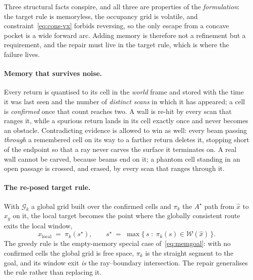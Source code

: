 \documentclass[11pt,a4paper]{article}
\newcommand{\astar}{$A^\star$}
\begin{document}
Three structural facts conspire, and all three are properties of the \emph{formulation}: the target rule is
memoryless, the occupancy grid is volatile, and constraint~\eqref{eq:cons-vx} forbids reversing, so the only
escape from a concave pocket is a wide forward arc. Adding memory is therefore not a refinement but a
requirement, and the repair must live in the target rule, which is where the failure lives.

\paragraph{Memory that survives noise.} Every return is quantised to its cell in the \emph{world} frame and
stored with the time it was last seen and the number of \emph{distinct scans} in which it has appeared; a
cell is \emph{confirmed} once that count reaches two. A wall is re-hit by every scan that ranges it, while a
spurious return lands in its cell exactly once and never becomes an obstacle. Contradicting evidence is
allowed to win as well: every beam passing \emph{through} a remembered cell on its way to a farther return
deletes it, stopping short of the endpoint so that a ray never carves the surface it terminates on. A real
wall cannot be carved, because beams end on it; a phantom cell standing in an open passage is crossed, and
erased, by every scan that ranges through it.

\paragraph{The re-posed target rule.} With $\mathcal{G}_k$ a global grid built over the confirmed cells and
$\pi_k$ the \astar{} path from $\hat x$ to $x_g$ on it, the local target becomes the point where the globally
consistent route exits the local window,
\begin{equation}
  x_{\mathrm{local}} \;=\; \pi_k(s^\star),
  \qquad
  s^\star \;=\; \max\{\,s \;:\; \pi_k(s)\in\mathcal{W}(\hat x)\,\}.
  \label{eq:memgoal}
\end{equation}
The greedy rule is the empty-memory special case of~\eqref{eq:memgoal}: with no confirmed cells the global
grid is free space, $\pi_k$ is the straight segment to the goal, and its window exit \emph{is} the
ray--boundary intersection. The repair generalises the rule rather than replacing it.
\end{document}

